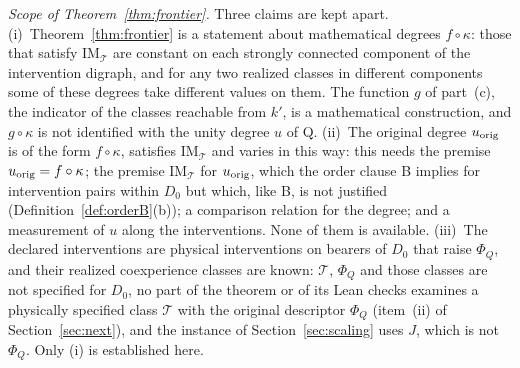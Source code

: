 \emph{Scope of Theorem~\ref{thm:frontier}.} Three claims are kept apart. (i)~Theorem~\ref{thm:frontier} is a statement about mathematical degrees $f\circ\kappa$: those that satisfy $\mathrm{IM}_{\mathcal T}$ are constant on each strongly connected component of the intervention digraph, and for any two realized classes in different components some of these degrees take different values on them. The function $g$ of part~(c), the indicator of the classes reachable from $k'$, is a mathematical construction, and $g\circ\kappa$ is not identified with the unity degree $u$ of Q. (ii)~The original degree $u_{\rm orig}$ is of the form $f\circ\kappa$, satisfies $\mathrm{IM}_{\mathcal T}$ and varies in this way: this needs the premise $u_{\rm orig}=f\circ\kappa$; the premise $\mathrm{IM}_{\mathcal T}$ for $u_{\rm orig}$, which the order clause B implies for intervention pairs within $D_0$ but which, like B, is not justified (Definition~\ref{def:orderB}(b)); a comparison relation for the degree; and a measurement of $u$ along the interventions. None of them is available. (iii)~The declared interventions are physical interventions on bearers of $D_0$ that raise $\Phi_Q$, and their realized coexperience classes are known: $\mathcal T$, $\Phi_Q$ and those classes are not specified for $D_0$, no part of the theorem or of its Lean checks examines a physically specified class $\mathcal T$ with the original descriptor $\Phi_Q$ (item~(ii) of Section~\ref{sec:next}), and the instance of Section~\ref{sec:scaling} uses $J$, which is not $\Phi_Q$. Only (i) is established here.

